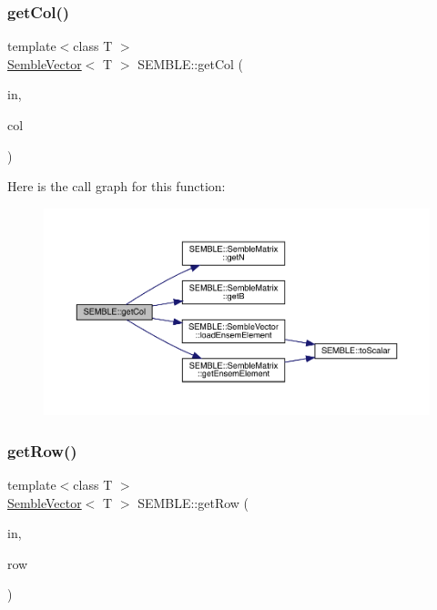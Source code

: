 \subsubsection{\texorpdfstring{getCol()}{getCol()}}
{\footnotesize\ttfamily template$<$class T $>$ \\
\mbox{\hyperlink{structSEMBLE_1_1SembleVector}{Semble\+Vector}}$<$ T $>$ S\+E\+M\+B\+L\+E\+::get\+Col (\begin{DoxyParamCaption}\item[{const \mbox{\hyperlink{structSEMBLE_1_1SembleMatrix}{Semble\+Matrix}}$<$ T $>$ \&}]{in,  }\item[{const int}]{col }\end{DoxyParamCaption})}

Here is the call graph for this function\+:
\nopagebreak
\begin{figure}[H]
\begin{center}
\leavevmode
\includegraphics[width=350pt]{d7/dfd/namespaceSEMBLE_ad20cc941d312a015ac7af98d54a39c9d_cgraph}
\end{center}
\end{figure}
\mbox{\label{namespaceSEMBLE_a06728ccc5290996ba307579f58f449cf}} 
\subsubsection{\texorpdfstring{getRow()}{getRow()}}
{\footnotesize\ttfamily template$<$class T $>$ \\
\mbox{\hyperlink{structSEMBLE_1_1SembleVector}{Semble\+Vector}}$<$ T $>$ S\+E\+M\+B\+L\+E\+::get\+Row (\begin{DoxyParamCaption}\item[{const \mbox{\hyperlink{structSEMBLE_1_1SembleMatrix}{Semble\+Matrix}}$<$ T $>$ \&}]{in,  }\item[{const int}]{row }\end{DoxyParamCaption})}


